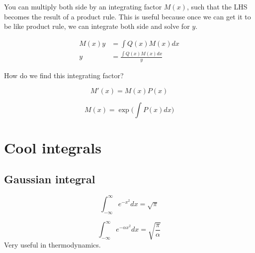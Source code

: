 You can multiply both side by an integrating factor $M(x)$, such that the LHS becomes the result of a product rule. This is useful because once we can get it to be like product rule, we can integrate both side and solve for $y$.

\begin{align}
    M(x)y &= \int Q(x)M(x)dx\\
    y &= \frac{\int Q(x)M(x)dx}{y}
\end{align}

How do we find this integrating factor?

\begin{equation}
    M'(x)=M(x)P(x)
\end{equation}

\begin{equation}
    \boxed{M(x)=\exp\bigg(\int P(x)dx \bigg)}
\end{equation}

\section{Cool integrals}
\subsection{Gaussian integral}
\begin{equation}
    \int_{-\infty}^\infty e^{-x^2}dx=\sqrt{\pi}
\end{equation}

\begin{equation}
    \int_{-\infty}^\infty e^{-\alpha x^2}dx=\sqrt{\frac{\pi}{\alpha}}
\end{equation}
Very useful in thermodynamics. 
